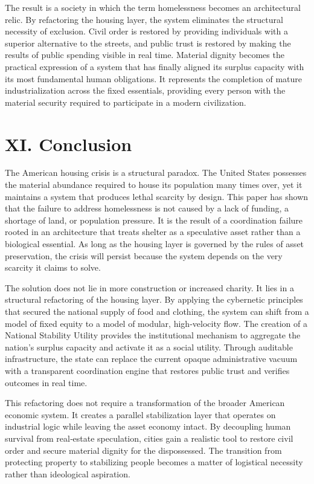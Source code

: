 \documentclass[
  12pt,
]{article}
\begin{document}
The result is a society in which the term homelessness becomes an architectural relic. By refactoring the housing layer, the system eliminates the structural necessity of exclusion. Civil order is restored by providing individuals with a superior alternative to the streets, and public trust is restored by making the results of public spending visible in real time. Material dignity becomes the practical expression of a system that has finally aligned its surplus capacity with its most fundamental human obligations. It represents the completion of mature industrialization across the fixed essentials, providing every person with the material security required to participate in a modern civilization.

\newpage

\hypertarget{xi.-conclusion}{%
\section{XI. Conclusion}\label{xi.-conclusion}}

The American housing crisis is a structural paradox. The United States possesses the material abundance required to house its population many times over, yet it maintains a system that produces lethal scarcity by design. This paper has shown that the failure to address homelessness is not caused by a lack of funding, a shortage of land, or population pressure. It is the result of a coordination failure rooted in an architecture that treats shelter as a speculative asset rather than a biological essential. As long as the housing layer is governed by the rules of asset preservation, the crisis will persist because the system depends on the very scarcity it claims to solve.

The solution does not lie in more construction or increased charity. It lies in a structural refactoring of the housing layer. By applying the cybernetic principles that secured the national supply of food and clothing, the system can shift from a model of fixed equity to a model of modular, high‑velocity flow. The creation of a National Stability Utility provides the institutional mechanism to aggregate the nation's surplus capacity and activate it as a social utility. Through auditable infrastructure, the state can replace the current opaque administrative vacuum with a transparent coordination engine that restores public trust and verifies outcomes in real time.

This refactoring does not require a transformation of the broader American economic system. It creates a parallel stabilization layer that operates on industrial logic while leaving the asset economy intact. By decoupling human survival from real‑estate speculation, cities gain a realistic tool to restore civil order and secure material dignity for the dispossessed. The transition from protecting property to stabilizing people becomes a matter of logistical necessity rather than ideological aspiration.
\end{document}
